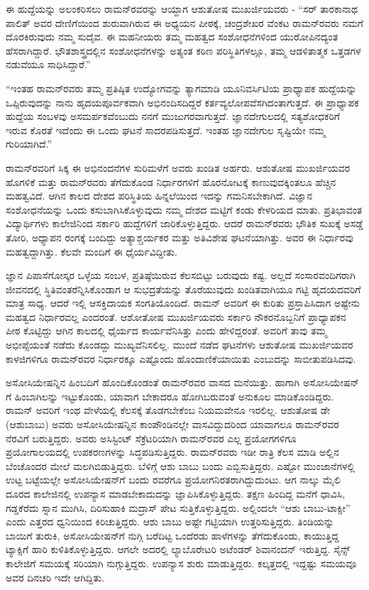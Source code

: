 ಈ ಹುದ್ದೆಯನ್ನು ಅಲಂಕರಿಸಲು ರಾಮನ್‍ರವರನ್ನು ಆಯ್ದಾಗ ಆಶುತೋಷ ಮುಖರ್ಜಿಯವರು - “ಸರ್ ತಾರಕಾನಾಥ ಪಾಲಿತ್ ಅವರ ದೇಣಿಗೆಯಿಂದ ಶುರುವಾಗಿರುವ ಈ ಅಧ್ಯಯನ ಪೀಠಕ್ಕೆ, ಚಂದ್ರಶೇಖರ ವೆಂಕಟ ರಾಮನ್‍ರವರು ನಮಗೆ ದೊರಕಿರುವುದು ನಮ್ಮ ಸುದೈವ. ಈ ಮಹನೀಯರು ತಮ್ಮ ಮಹತ್ವದ ಸಂಶೋಧನೆಗಳಿಂದ ಯುರೋಪಿನದ್ಯಂತ ಹೆಸರಾಗಿದ್ದಾರೆ. ಭೌತಶಾಸ್ತ್ರದಲ್ಲಿನ ಸಂಶೋಧನೆಗಳನ್ನು ಅತ್ಯಂತ ಕಠಿಣ ಪರಿಸ್ಥಿತಿಗಳಲ್ಲೂ, ತಮ್ಮ ಆಡಳಿತಾತ್ಮಕ ಒತ್ತಡಗಳ ನಡುವೆಯೂ ಸಾಧಿಸಿದ್ದಾರೆ.”

“ಇಂತಹ ರಾಮನ್‍ರವರು ತಮ್ಮ ಪ್ರತಿಷ್ಠಿತ ಉದ್ಯೋಗವನ್ನು ತ್ಯಾಗಮಾಡಿ ಯೂನಿವರ್ಸಿಟಿಯ ಪ್ರಾಧ್ಯಾಪಕ ಹುದ್ದೆಯನ್ನು ಒಪ್ಪಿರುವುದನ್ನು ನಾನು ಹೃದಯಪೂರ್ವಕವಾಗಿ ಅಭಿನಂದಿಸದಿದ್ದರೆ ಕರ್ತವ್ಯಲೋಪವೆಸಗಿದಂತಾಗುತ್ತದೆ. ಈ ಪ್ರಾಧ್ಯಾಪಕ ಹುದ್ದೆಯ ಸಂಬಳವು ಅಸಮರ್ಪಕವೆಂಬುದು ನನಗೆ ಮುಜುಗರವಾಗುತ್ತದೆ. ಜ್ಞಾನದೇಗುಲದಲ್ಲಿ ಸತ್ಯಶೋಧಕರಿಗೆ ಇರುವ ಕೊರತೆ ಇದೆಂದು ಈ ಒಂದು ಘಟನೆ ಸಾದರಪಡಿಸುತ್ತದೆ. ಇಂತಹ ಜ್ಞಾನದೇಗುಲ ಸೃಷ್ಟಿಯೇ ನಮ್ಮ ಗುರಿಯಾಗಿದೆ.”

ರಾಮನ್‍ರವರಿಗೆ ಸಿಕ್ಕ ಈ ಅಭಿನಂದನೆಗಳ ಸುರಿಮಳೆಗೆ ಅವರು ಖಂಡಿತ ಅರ್ಹರು. ಆಶುತೋಷ ಮುಖರ್ಜಿಯವರ ಹೊಗಳಿಕೆ ಮತ್ತು ರಾಮನ್‍ರವರು ತೆಗೆದುಕೊಂಡ ನಿರ್ಧಾರಗಳಿಗೆ ಹೊರನೋಟಕ್ಕೆ ಕಾಣುವುದಕ್ಕಿಂತಲೂ ಹೆಚ್ಚಿನ ಮಹತ್ವವಿದೆ. ಆಗಿನ ಕಾಲದ ದೇಶದ ಪರಿಸ್ಥಿತಿಯ ಹಿನ್ನಲೆಯಿಂದ ಇದನ್ನು ಗಮನಿಸಬೇಕಾಗಿದೆ. ವಿಜ್ಞಾನ ಸಂಶೋಧನೆಯನ್ನು ಒಂದು ಕಸುಬಾಗಿಸಿಕೊಳ್ಳುವುದು ನಮ್ಮ ದೇಶದ ಮಟ್ಟಿಗೆ ಕಂಡು ಕೇಳರಿಯದ ಮಾತು. ಪ್ರತಿಭಾವಂತ ವಿದ್ಯಾರ್ಥಿಗಳು ಕಾಲೇಜಿನಿಂದ ಸರ್ಕಾರಿ ಹುದ್ದೆಗಳಿಗೆ ಜಾರಿಕೊಳ್ಳುತ್ತಿದ್ದರು. ಆದರೆ ರಾಮನ್‍ರವರು ಭೌತಿಕ ಸುಖಕ್ಕೆ ಅಸಡ್ಡೆ ತೋರಿ, ಅಧ್ಯಾಪನ ರಂಗಕ್ಕೆ ಬಂದಿದ್ದು ಅತ್ಯಾಶ್ಚರ್ಯಕರ ಮತ್ತು ಅತಿವಿಶೇಷ ಘಟನೆಯಾಗಿತ್ತು. ಅವರ ಈ ನಿರ್ಧಾರವು ಮಹತ್ವದ್ದಾಗಿತ್ತು. ಕೆಲವೇ ಮಂದಿಗೆ ಈ ಧೈರ್ಯವಿದ್ದೀತು.

ಜ್ಞಾನ ಪಿಪಾಸೆಗೋಸ್ಕರ ಒಳ್ಳೆಯ ಸಂಬಳ, ಪ್ರತಿಷ್ಠೆಯಿರುವ ಕೆಲಸಬಿಟ್ಟು ಬರುವುದು ಕಷ್ಟ. ಅಲ್ಲದೆ ಸಂಸಾರವಂದಿಗರಾಗಿ ಜೀವನದಲ್ಲಿ ಸ್ಥಿತಿವಂತರೆನ್ನಿಸಿಕೊಂಡಾಗ ಆ ಸುಭದ್ರತೆಯನ್ನು ತೊರೆಯುವುದು ಖಂಡಿತವಾಗಿಯೂ ಗಟ್ಟಿ ಹೃದಯದವರಿಗೆ ಮಾತ್ರ ಸಾಧ್ಯ. ಆದರೆ ಇಲ್ಲಿ ಆಸಕ್ತಿದಾಯಕ ಸಂಗತಿಯೊಂದಿದೆ. ರಾಮನ್ ಅವರಿಗೆ ಈ ಕುರಿತು ಪ್ರಸ್ತಾಪಿಸಿದಾಗ ಅಷ್ಟೇನು ಮಹತ್ವದ ನಿರ್ಧಾರವಲ್ಲ ಎಂದರಂತೆ. ಆಶೋತೋಷ ಮುಖರ್ಜಿಯವರು ಸರ್ಕಾರಿ ನೌಕರನೊಬ್ಬನಿಗೆ ಪ್ರಾಧ್ಯಾಪಕನ ಪೀಠ ಕೊಟ್ಟಿದ್ದು ಆಗಿನ ಕಾಲದಲ್ಲಿ ಧೈರ್ಯದ ಕಾರ್ಯವೆನಿಸಿತ್ತು ಎಂದು ಹೇಳಿದ್ದರಂತೆ. ಅವರಿಗೆ ತಾವು ತಮ್ಮ ಅಭೀಪ್ಸೆಯಂತೆ ನಡೆದು ಕೊಂಡದ್ದು ಮುಖ್ಯವೆನಿಸಲಿಲ್ಲ. ಮುಂದೆ ನಡೆದ ಘಟನೆಗಳು ಆಶುತೋಷ ಮುಖರ್ಜಿಯವರ ಕಾಳಜಿಗಳಿಗೂ ರಾಮನ್‍ರವರ ನಿರ್ಧಾರಕ್ಕೂ ಎಷ್ಟೊಂದು ಹೊಂದಾಣಿಕೆಯಾಯಿತು ಎಂಬುದನ್ನು ಸಾಬೀತುಪಡಿಸಿದವು.

ಅಸೋಸಿಯೇಷನ್ನಿನ ಹಿಂಬದಿಗೆ ಹೊಂದಿಕೊಂಡಂತೆ ರಾಮನ್‍ರವರ ವಾಸದ ಮನೆಯಿತ್ತು. ಹಾಗಾಗಿ ಅಸೋಸಿಯೇಷನ್ ಗೆ ಹಿಂಬಾಗಿಲನ್ನು ಇಟ್ಟುಕೊಂಡು, ಯಾವಾಗ ಬೇಕಾದರೂ ಹೋಗಿಬರುವಂತೆ ಅನುಕೂಲ ಮಾಡಿಕೊಂಡಿದ್ದರು. ರಾಮನ್ ಅವರಿಗೆ ಇಂಥ ವೇಳೆಯಲ್ಲಿ ಕೆಲಸಕ್ಕೆ ತೊಡಗಬೇಕೆಂಬ ನಿಯಮವೇನೂ ಇರಲಿಲ್ಲ. ಆಶುತೋಷ ಡೇ (ಆಶುಬಾಬು) ಅವರು ಅಸೋಸಿಯೇಷನ್ನಿನ ಕಾಂಪೌಂಡಿನಲ್ಲೇ ವಾಸವಿದ್ದುದರಿಂದ ಯಾವಾಗಲೂ ರಾಮನ್‍ರವರ ನೆರವಿಗೆ ಬರುತ್ತಿದ್ದರು. ಅವರು ಅಸಿಸ್ಟಿಂಟ್ ಸೆಕ್ರೆಟರಿಯಾಗಿ ರಾಮನ್‍ರವರ ಎಲ್ಲ ಪ್ರಯೋಗಗಳಿಗೂ ಪ್ರಯೋಗಾಲಯದಲ್ಲಿ ಉಪಕರಣಗಳನ್ನು ಸಿದ್ಧಪಡಿಸುತ್ತಿದ್ದರು. ರಾಮನ್‍ರವರು ಇಡೀ ರಾತ್ರಿ ಕೆಲಸ ಮಾಡಿ ಅಲ್ಲಿನ ಬೆಂಚೊಂದರ ಮೇಲೆ ಮಲಗಿಬಿಡುತ್ತಿದ್ದರು. ಬೆಳಿಗ್ಗೆ ಆಶು ಬಾಬು ಬಂದು ಎಬ್ಬಿಸುತ್ತಿದ್ದರು. ಎಷ್ಟೋ ಮುಂಜಾನೆಗಳಲ್ಲಿ ಉಟ್ಟ ಬಟ್ಟೆಯಲ್ಲೇ ಅಸೋಸಿಯೇಷನ್‍ಗೆ ಬಂದು  ರವರೆಗೂ ಪ್ರಯೋಗನಿರತರಾಗಿದ್ದುದುಂಟು. ಆಗ ನಾಲ್ಕು ಮೈಲಿ ದೂರದ ಕಾಲೇಜಿನಲ್ಲಿ ಉಪನ್ಯಾಸ ಮಾಡಬೇಕಾದುದನ್ನು ಜ್ಞಾಪಿಸಿಕೊಳ್ಳುತ್ತಿದ್ದರು. ತಕ್ಷಣ ಹಿಂದಿದ್ದ ಮನೆಗೆ ಧಾವಿಸಿ, ಗಡ್ಡಕೆರೆದು ಸ್ನಾನ ಮುಗಿಸಿ, ದಿರಿಸುಹಾಕಿ ಮದ್ರಾಸ್ ಪೇಟ ಸುತ್ತಿಕೊಳ್ಳುತ್ತಿದ್ದರು. ಅಲ್ಲಿಂದಲೇ “ಆಶು ಬಾಬು-ಟಾಕ್ಸೀ” ಎಂದು ಎತ್ತರದ ಧ್ವನಿಯಿಂದ ಕಿರಿಚುತ್ತಿದ್ದರು. ಆಶು ಬಾಬು ಅಷ್ಟೇ ಗಟ್ಟಿಯಾಗಿ ಉತ್ತರಿಸುತ್ತಿದ್ದರು. ತಿಂಡಿಯನ್ನು ಬಾಯಿಗೆ ತುರುಕಿ, ಅಸೋಸಿಯೇಷನ್‍ಗೆ ನುಗ್ಗಿ ಬರೆದಿಟ್ಟ ಒಂದೆರಡು ಹಾಳೆಗಳನ್ನು ತೆಗೆದುಕೊಂಡು, ಕಾಯುತ್ತಿದ್ದ ಟ್ಯಾಕ್ಸಿಗೆ ಹಾರಿ ಕುಳಿತಿಕೊಳ್ಳುತ್ತಿದ್ದರು. ಆಗಲೇ ಅದರಲ್ಲಿ ಲ್ಯಾಬೊರೇಟರಿ ಅಟೆಂಡರ್ ಶಿವಾನಂದನ್ ಇರುತ್ತಿದ್ದ. ಸೈನ್ಸ್ ಕಾಲೇಜಿಗೆ ಸಮಯಕ್ಕೆ ಸರಿಯಾಗಿ ನುಗ್ಗುತ್ತಿದ್ದರು. ಉಪನ್ಯಾಸ ಶುರು ಮಾಡುತ್ತಿದ್ದರು. ಕಲ್ಕತ್ತದಲ್ಲಿ ಇದ್ದಷ್ಟು ಸಮಯವೂ ಅವರ ದಿನಚರಿ ಇದೇ ಆಗಿದ್ದಿತು.

